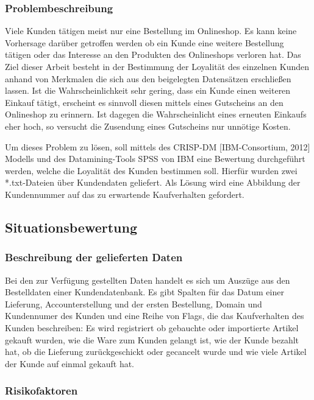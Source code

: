 \documentclass[a4paper,12pt]{article}
\begin{document}
\subsubsection{Problembeschreibung}
Viele Kunden tätigen meist nur eine Bestellung im Onlineshop. Es kann keine Vorhersage darüber getroffen werden ob ein Kunde eine weitere Bestellung tätigen oder das Interesse an den Produkten des Onlineshops verloren hat. Das Ziel dieser Arbeit besteht in der Bestimmung der Loyalität des einzelnen Kunden anhand von Merkmalen die sich aus den beigelegten Datensätzen erschließen lassen. Ist die Wahrscheinlichkeit sehr gering, dass ein Kunde einen weiteren Einkauf tätigt, erscheint es sinnvoll diesen mittels eines Gutscheins an den Onlineshop zu erinnern. Ist dagegen die Wahrscheinlicht eines erneuten Einkaufs eher hoch, so versucht die Zusendung eines Gutscheins nur unnötige Kosten.  
\par
Um dieses Problem zu lösen, soll mittels des CRISP-DM [IBM-Consortium, 2012] Modells
und des Datamining-Tools SPSS von IBM eine Bewertung durchgeführt werden, welche die
Loyalität des Kunden bestimmen soll. Hierfür wurden zwei *.txt-Dateien über Kundendaten geliefert.
Als Lösung wird eine Abbildung der Kundennummer auf das zu erwartende Kaufverhalten gefordert. 

\subsection{Situationsbewertung}

\subsubsection{Beschreibung der gelieferten Daten}
Bei den zur Verfügung gestellten Daten  handelt es sich um Auszüge aus den Bestelldaten einer Kundendatenbank.
Es gibt Spalten für das Datum einer Lieferung, Accounterstellung und der
ersten Bestellung, Domain und Kundennumer des Kunden und eine Reihe von Flags, die das Kaufverhalten des Kunden beschreiben:
Es wird registriert ob gebauchte oder importierte Artikel gekauft wurden, wie die Ware zum Kunden gelangt ist, wie der Kunde bezahlt hat, ob die Lieferung zurückgeschickt oder gecancelt wurde und wie viele Artikel der Kunde auf einmal gekauft hat.

\subsubsection{Risikofaktoren}
\end{document}
